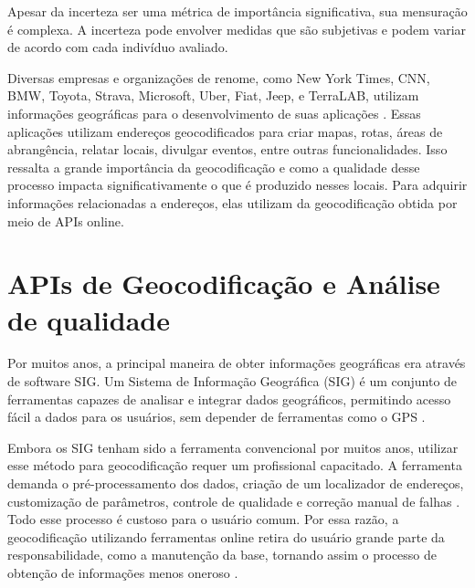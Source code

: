 Apesar da incerteza ser uma métrica de importância significativa, sua mensuração é complexa. A incerteza pode envolver medidas que são subjetivas e podem variar de acordo com cada indivíduo avaliado. 


Diversas empresas e organizações de renome, como New York Times, CNN, BMW, Toyota, Strava, Microsoft, Uber, Fiat, Jeep, e TerraLAB,  utilizam informações geográficas para o desenvolvimento de suas aplicações \cite{ors, terralab, mapbox, tomtom}. Essas aplicações utilizam endereços geocodificados para criar mapas, rotas, áreas de abrangência, relatar locais, divulgar eventos, entre outras funcionalidades. Isso ressalta a grande importância da geocodificação e como a qualidade desse processo impacta significativamente o que é produzido nesses locais. Para adquirir informações relacionadas a endereços, elas utilizam da geocodificação obtida por meio de APIs online.

\section{APIs de Geocodificação e Análise de qualidade}

Por muitos anos, a principal maneira de obter informações geográficas era através de software SIG. Um Sistema de Informação Geográfica (SIG) é um conjunto de ferramentas capazes de analisar e integrar dados geográficos, permitindo acesso fácil a dados para os usuários, sem depender de ferramentas como o GPS \cite{stein2021geoprocessamento}.

Embora os SIG tenham sido a ferramenta convencional por muitos anos, utilizar esse método para geocodificação requer um profissional capacitado. A ferramenta demanda o pré-processamento dos dados, criação de um localizador de endereços, customização de parâmetros, controle de qualidade e correção manual de falhas \cite{Chow2016}. Todo esse processo é custoso para o usuário comum. Por essa razão, a geocodificação utilizando ferramentas online retira do usuário grande parte da responsabilidade, como a manutenção da base, tornando assim o processo de obtenção de informações menos oneroso \cite{Chow2016}.

